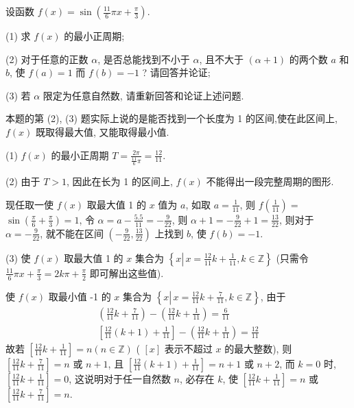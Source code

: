 \begin{example}
	设函数 $f(x)=\sin \left(\frac{11}{6} \pi x+\frac{\pi}{3}\right)$.

	(1) 求 $f(x)$ 的最小正周期;

	(2) 对于任意的正数 $\alpha$, 是否总能找到不小于 $\alpha$, 且不大于 $(\alpha+1)$ 的两个数 $a$ 和 $b$, 使 $f(a)=1$ 而 $f(b)=-1$ ? 请回答并论证;

	(3) 若 $\alpha$ 限定为任意自然数, 请重新回答和论证上述问题.
\end{example}
\begin{analysis}
	本题的第 (2), (3) 题实际上说的是能否找到一个长度为 1 的区间,使在此区间上, $f(x)$ 既取得最大值, 又能取得最小值.
\end{analysis}
\begin{solution}
	(1) $f(x)$ 的最小正周期 $T=\frac{2 \pi}{\frac{11}{6} \pi}=\frac{12}{11}$.

	(2) 由于 $T>1$, 因此在长为 1 的区间上, $f(x)$ 不能得出一段完整周期的图形.

	现任取一使 $f(x)$ 取最大值 1 的 $x$ 值为 $a$, 如取 $a=\frac{1}{11}$, 则 $f\left(\frac{1}{11}\right)=$ $\sin \left(\frac{\pi}{6}+\frac{\pi}{3}\right)=1$, 令 $\alpha=a-\frac{5.5}{11}=-\frac{9}{22}$, 则 $\alpha+1=-\frac{9}{22}+1=\frac{13}{22}$, 则对于 $\alpha=-\frac{9}{22}$, 就不能在区间 $\left(-\frac{9}{22}, \frac{13}{22}\right)$ 上找到 $b$, 使 $f(b)=-1$.

	(3) 使 $f(x)$ 取最大值 1 的 $x$ 集合为 $\left\{x \left\lvert\, x=\frac{12}{11} k+\frac{1}{11}\right., k \in \mathbb{Z}\right\}$ (只需令 $\frac{11}{6} \pi x+\frac{\pi}{3}=2 k \pi+\frac{\pi}{2}$ 即可解出这些值).

	使 $f(x)$ 取最小值 -1 的 $x$ 集合为 $\left\{x \left\lvert\, x=\frac{12}{11} k+\frac{7}{11}\right., k \in \mathbb{Z}\right\}$, 由于
	$$
		\begin{gathered}
			\left(\frac{12}{11} k+\frac{7}{11}\right)-\left(\frac{12}{11} k+\frac{1}{11}\right)=\frac{6}{11} \\
			{\left[\frac{12}{11}(k+1)+\frac{1}{11}\right]-\left(\frac{12}{11} k+\frac{1}{11}\right)=\frac{12}{11}}
		\end{gathered}
	$$
	故若 $\left[\frac{12}{11} k+\frac{1}{11}\right]=n(n \in \mathbb{Z})$ ( $[x]$ 表示不超过 $x$ 的最大整数), 则 $\left[\frac{12}{11} k+\frac{7}{11}\right]=n$ 或 $n+1$, 且 $\left[\frac{12}{11}(k+1)+\frac{1}{11}\right]=n+1$ 或 $n+2$, 而 $k=0$ 时, $\left[\frac{12}{11} k+\frac{1}{11}\right]=0$, 这说明对于任一自然数 $n$, 必存在 $k$, 使 $\left[\frac{12}{11} k+\frac{1}{11}\right]=n$ 或 $\left[\frac{12}{11} k+\frac{7}{11}\right]=n$.


\end{solution}

